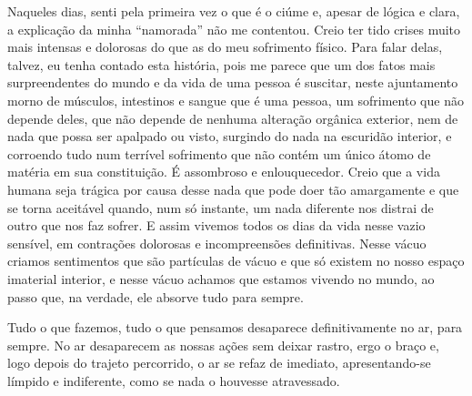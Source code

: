 Naqueles dias, senti pela primeira vez o que é o ciúme e, apesar de
lógica e clara, a explicação da minha ``namorada'' não me contentou.
Creio ter tido crises muito mais intensas e dolorosas do que as do meu
sofrimento físico. Para falar delas, talvez, eu tenha contado esta
história, pois me parece que um dos fatos mais surpreendentes do mundo e
da vida de uma pessoa é suscitar, neste ajuntamento morno de músculos,
intestinos e sangue que é uma pessoa, um sofrimento que não depende
deles, que não depende de nenhuma alteração orgânica exterior, nem de
nada que possa ser apalpado ou visto, surgindo do nada na escuridão
interior, e corroendo tudo num terrível sofrimento que não contém um
único átomo de matéria em sua constituição. É assombroso e
enlouquecedor. Creio que a vida humana seja trágica por causa desse nada
que pode doer tão amargamente e que se torna aceitável quando, num só
instante, um nada diferente nos distrai de outro que nos faz sofrer. E
assim vivemos todos os dias da vida nesse vazio sensível, em contrações
dolorosas e incompreensões definitivas. Nesse vácuo criamos sentimentos
que são partículas de vácuo e que só existem no nosso espaço imaterial
interior, e nesse vácuo achamos que estamos vivendo no mundo, ao passo
que, na verdade, ele absorve tudo para sempre.

Tudo o que fazemos, tudo o que pensamos desaparece definitivamente no
ar, para sempre. No ar desaparecem as nossas ações sem deixar rastro,
ergo o braço e, logo depois do trajeto percorrido, o ar se refaz de
imediato, apresentando-se límpido e indiferente, como se nada o houvesse
atravessado.



